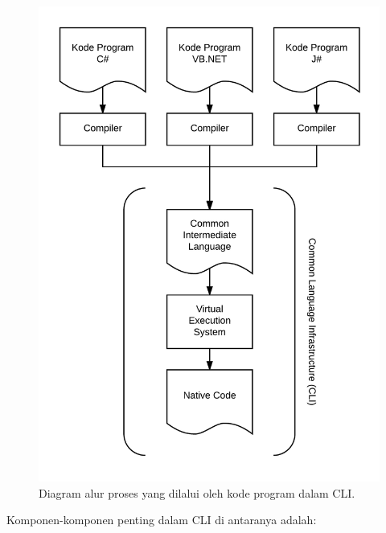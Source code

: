 \begin{figure}[h]
    \centering
    \includegraphics[scale=0.2]{Gambar/CLI.png}
    \caption[Diagram alur proses yang dilalui oleh kode program dalam CLI.]{Diagram alur proses yang dilalui oleh kode program dalam CLI.} 
    \label{fig:cli}
\end{figure}

Komponen-komponen penting dalam CLI di antaranya adalah\cite{CLI:2016}:

